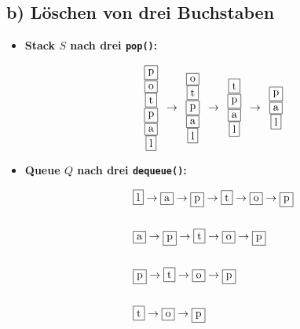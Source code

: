 \documentclass[a4paper,12pt]{article}
\begin{document}
\subsection*{b) Löschen von drei Buchstaben}

\begin{itemize}
  \item \textbf{Stack \( S \) nach drei \texttt{pop()}:}
  
  \[
  \begin{array}{c}
    \fbox{p} \\
    \fbox{o} \\
    \fbox{t} \\
    \fbox{p} \\
    \fbox{a} \\
    \fbox{l}
  \end{array}
  \rightarrow
  \begin{array}{c}
    \fbox{o} \\
    \fbox{t} \\
    \fbox{p} \\
    \fbox{a} \\
    \fbox{l}
  \end{array}
  \rightarrow
    \begin{array}{c}
    \fbox{t} \\
    \fbox{p} \\
    \fbox{a} \\
    \fbox{l}
  \end{array}
  \rightarrow
    \begin{array}{c}
    \fbox{p} \\
    \fbox{a} \\
    \fbox{l}
  \end{array}
  \]

  \item \textbf{Queue \( Q \) nach drei \texttt{dequeue()}:}
  
 \begin{align*}
     &\fbox{l} \rightarrow \fbox{a} \rightarrow \fbox{p} \rightarrow \fbox{t}  \rightarrow \fbox{o} \rightarrow \fbox{p} \\\\
    &\fbox{a} \rightarrow \fbox{p} \rightarrow \fbox{t} \rightarrow \fbox{o} \rightarrow \fbox{p} \\\\
    &\fbox{p} \rightarrow \fbox{t} \rightarrow \fbox{o} \rightarrow \fbox{p} \\\\
    &\fbox{t} \rightarrow \fbox{o} \rightarrow \fbox{p}
  \end{align*}
\end{itemize}
\end{document}

